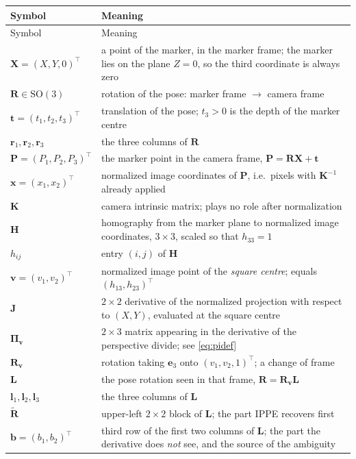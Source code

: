 \documentclass[11pt,a4paper]{article}
\theoremstyle{remark}
\newcommand{\Rmat}{\mathbf{R}}
\newcommand{\Rtil}{\widetilde{\mathbf{R}}}
\newcommand{\Hmat}{\mathbf{H}}
\newcommand{\Jmat}{\mathbf{J}}
\newcommand{\Kmat}{\mathbf{K}}
\newcommand{\Lmat}{\mathbf{L}}
\newcommand{\Rvee}{\mathbf{R}_{\vvec}}
\newcommand{\Pimat}{\boldsymbol{\Pi}_{\vvec}}
\newcommand{\bvec}{\mathbf{b}}
\newcommand{\evec}{\mathbf{e}}
\newcommand{\lvec}{\mathbf{l}}
\newcommand{\Pvec}{\mathbf{P}}
\newcommand{\rvec}{\mathbf{r}}
\newcommand{\tvec}{\mathbf{t}}
\newcommand{\vvec}{\mathbf{v}}
\newcommand{\xvec}{\mathbf{x}}
\newcommand{\Xvec}{\mathbf{X}}
\begin{document}
\begin{longtable}{@{}lp{11.2cm}@{}}
\toprule
Symbol & Meaning \\
\midrule
\endfirsthead
\toprule
Symbol & Meaning \\
\midrule
\endhead
$\Xvec = (X,Y,0)^{\top}$ & a point of the marker, in the marker frame; the
  marker lies on the plane $Z=0$, so the third coordinate is always zero \\
$\Rmat \in \mathrm{SO}(3)$ & rotation of the pose: marker frame $\to$ camera
  frame \\
$\tvec = (t_1,t_2,t_3)^{\top}$ & translation of the pose; $t_3 > 0$ is the
  depth of the marker centre \\
$\rvec_1,\rvec_2,\rvec_3$ & the three columns of $\Rmat$ \\
$\Pvec = (P_1,P_2,P_3)^{\top}$ & the marker point in the camera frame,
  $\Pvec = \Rmat\Xvec + \tvec$ \\
$\xvec = (x_1,x_2)^{\top}$ & normalized image coordinates of $\Pvec$, i.e.\
  pixels with $\Kmat^{-1}$ already applied \\
$\Kmat$ & camera intrinsic matrix; plays no role after normalization \\
$\Hmat$ & homography from the marker plane to normalized image coordinates,
  $3\times3$, scaled so that $h_{33}=1$ \\
$h_{ij}$ & entry $(i,j)$ of $\Hmat$ \\
$\vvec = (v_1,v_2)^{\top}$ & normalized image point of the \emph{square
  centre}; equals $(h_{13},h_{23})^{\top}$ \\
$\Jmat$ & $2\times2$ derivative of the normalized projection with respect to
  $(X,Y)$, evaluated at the square centre \\
$\Pimat$ & $2\times3$ matrix appearing in the derivative of the perspective
  divide; see \eqref{eq:pidef} \\
$\Rvee$ & rotation taking $\evec_3$ onto $(v_1,v_2,1)^{\top}$; a change of
  frame \\
$\Lmat$ & the pose rotation seen in that frame, $\Rmat = \Rvee\Lmat$ \\
$\lvec_1,\lvec_2,\lvec_3$ & the three columns of $\Lmat$ \\
$\Rtil$ & upper-left $2\times2$ block of $\Lmat$; the part IPPE recovers first \\
$\bvec = (b_1,b_2)^{\top}$ & third row of the first two columns of $\Lmat$; the
  part the derivative does \emph{not} see, and the source of the ambiguity \\

\end{longtable}
\end{document}
